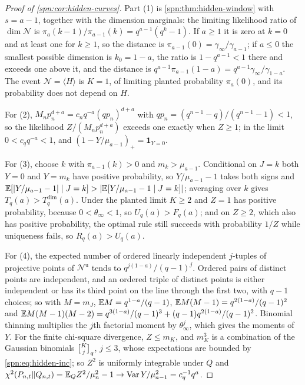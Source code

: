 \begin{proof}[Proof of \cref{spn:cor:hidden-curves}]
Part (1) is \cref{spn:thm:hidden-window} with $s=a-1$, together with the dimension marginals: the limiting
likelihood ratio of $\dim\mathcal N$ is $\pi_a(k-1)/\pi_{a-1}(k)=q^{a-1}(q^k-1)$. If $a\ge1$ it is zero at
$k=0$ and at least one for $k\ge1$, so the distance is $\pi_{a-1}(0)=\gamma_\infty/\gamma_{a-1}$; if
$a\le0$ the smallest possible dimension is $k_0=1-a$, the ratio is $1-q^{a-1}<1$ there and exceeds one
above it, and the distance is $q^{a-1}\pi_{a-1}(1-a)=q^{a-1}\gamma_\infty/\gamma_{1-a}$. The event
$\mathcal N=\langle H\rangle$ is $K=1$, of limiting planted probability $\pi_a(0)$, and its
probability does not depend on $H$.

For (2), $M_np_n^{d+a}=c_nq^{-a}(qp_n)^{d+a}$ with $qp_n=(q^{n-1}-q)/(q^{n-1}-1)<1$, so the likelihood
$Z/(M_np_n^{d+a})$ exceeds one exactly when $Z\ge1$; in the limit $0<c_qq^{-a}<1$, and
$(1-Y/\mu_{a-1})_+=\mathbf 1_{Y=0}$.

For (3), choose $k$ with $\pi_{a-1}(k)>0$ and $m_k>\mu_{a-1}$. Conditional on $J=k$ both $Y=0$ and
$Y=m_k$ have positive probability, so $Y/\mu_{a-1}-1$ takes both signs and
$\mathbb{E}[\lvert Y/\mu_{a-1}-1\rvert\mid J=k]>\lvert\mathbb{E}[Y/\mu_{a-1}-1\mid J=k]\rvert$; averaging over $k$ gives
$T_q(a)>T^{\dim}_q(a)$. Under the planted limit $K\ge2$ and $Z=1$ has positive probability, because
$0<\theta_\infty<1$, so $U_q(a)>F_q(a)$; and on $Z\ge2$, which also has positive probability, the
optimal rule still succeeds with probability $1/Z$ while uniqueness fails, so $R_q(a)>U_q(a)$.

For (4), the expected number of ordered linearly independent $j$-tuples of projective points of
$\mathcal N^{\mathrm u}$ tends to $q^{j(1-a)}/(q-1)^j$. Ordered pairs of distinct points are
independent, and an ordered triple of distinct points is either independent or has its third point on
the line through the first two, with $q-1$ choices; so with $M=m_J$, $\mathbb{E} M=q^{1-a}/(q-1)$,
$\mathbb{E} M(M-1)=q^{2(1-a)}/(q-1)^2$ and $\mathbb{E} M(M-1)(M-2)=q^{3(1-a)}/(q-1)^3+(q-1)q^{2(1-a)}/(q-1)^2$.
Binomial thinning multiplies the $j$th factorial moment by $\theta_\infty^j$, which gives the moments of
$Y$. For the finite chi-square divergence, $Z\le m_K$, and $m_K^3$ is a combination of the Gaussian
binomials $\spnqbin Kj{q}$, $j\le3$, whose expectations are bounded by \eqref{spn:eq:hidden-inc}; so $Z^2$
is uniformly integrable under $Q$ and
$\chi^2(P_{n,t}\Vert Q_{n,t})=\mathbb{E}_QZ^2/\mu_n^2-1\to\operatorname{Var}Y/\mu_{a-1}^2=c_q^{-1}q^a$.


\end{proof}

